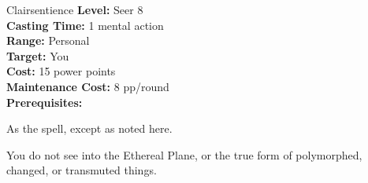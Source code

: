 {Clairsentience}
{
	\textbf{Level:}
	Seer 8\\
	\textbf{Casting Time:}
	1 mental action\\
	\textbf{Range:}
	Personal\\
	\textbf{Target:}
	You\\
	\textbf{Cost:}
	15 power points\\
	\textbf{Maintenance Cost:}
	8 pp/round\\
	\textbf{Prerequisites:}
	\\
}
{
	As the  spell, except as noted here.

	You do not see into the Ethereal Plane, or the true form of polymorphed, changed, or transmuted things.
}